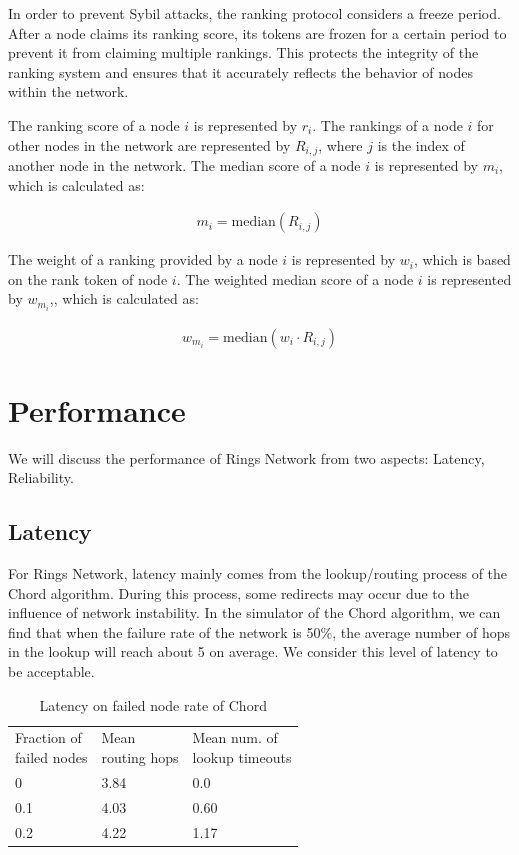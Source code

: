 \documentclass[twocolumn]{article}
\begin{document}
In order to prevent Sybil attacks, the ranking protocol considers a freeze period. After a node claims its ranking score, its tokens are frozen for a certain period to prevent it from claiming multiple rankings. This protects the integrity of the ranking system and ensures that it accurately reflects the behavior of nodes within the network.

The ranking score of a node $i$ is represented by $r_i$. The rankings of a node $i$ for other nodes in the network are represented by $R_{i,j}$, where $j$ is the index of another node in the network. The median score of a node $i$ is represented by $m_i$, which is calculated as:

\begin{gather}
m_i = \text{median}(R_{i,j})
\end{gather}

The weight of a ranking provided by a node $i$ is represented by $w_i$, which is based on the rank token of node $i$. The weighted median score of a node $i$ is represented by $w_{m_i}$,, which is calculated as:

\begin{gather}
w_{m_i} = \text{median}(w_i \cdot R_{i,j})
\end{gather}

\section{Performance}

We will discuss the performance of Rings Network from two aspects: Latency, Reliability.

\subsection{Latency}
For Rings Network, latency mainly comes from the lookup/routing process of the Chord algorithm. During this process, some redirects may occur due to the influence of network instability. In the simulator of the Chord algorithm, we can find that when the failure rate of the network is 50\%, the average number of hops in the lookup will reach about 5 on average. We consider this level of latency to be acceptable.

\begin{table}[htbp]
\begin{tabular}{l|l|l}
\cline{1-3}
  \shortstack{Fraction of \\failed nodes} & \shortstack{Mean \\routing hops} &\shortstack{Mean num. of \\lookup timeouts}   \\ \cline{1-3}
0                        & 3.84             & 0.0                     \\ \cline{1-3}
0.1                      & 4.03             & 0.60                    \\ \cline{1-3}
0.2                      & 4.22             & 1.17                    \\ \cline{1-3}
\end{tabular}
\caption{Latency on failed node rate of Chord \cite{Chord}}
\end{table}
\end{document}
